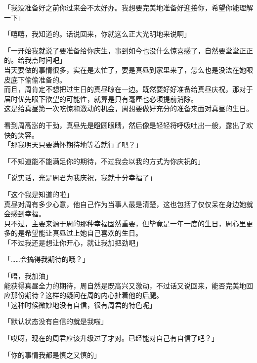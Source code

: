 「我没准备好之前你过来会不太好办。我想要完美地准备好迎接你，希望你能理解一下」

「嘻嘻，我知道的。话说回来，你就这么正大光明地来说啊」

「一开始我就说了要准备给你庆生，事到如今也没什么惊喜感了，自然要堂堂正正的。给我点时间吧」\\

当天要做的事情很多，实在是太忙了，要是真昼到家里来了，怎么也是没法在她眼皮底下偷偷准备的。\\

而且，周肯定不想把过生日的真昼晾在一边。既然要好好准备给真昼庆祝，那对于届时优先眼下欲望的可能性，就算是只有毫厘也必须提前消除。\\

这是给真昼第一次吃惊和激动的机会，周想要做好充分的准备来面对真昼的生日。

看到周高涨的干劲，真昼先是瞪圆眼睛，然后像是轻轻将呼吸吐出一般，露出了欢快的笑容。\\

「那我明天只要满怀期待地等着就行了吧？」

「不知道能不能满足你的期待，不过我会以我的方式为你庆祝的」

「说实话，光是周君为我庆祝，我就十分幸福了」

「这个我是知道的啦」\\

真昼对周有多少心意，他自己作为当事人最是清楚，这也包括了仅仅呆在身边她就会感到幸福。\\

只不过，主要来源于周的那种幸福固然重要，但毕竟是一年一度的生日，周心里更多的是希望能让真昼过上她自己喜欢的生日。\\

「不过我还是想让你开心，就让我加把劲吧」

「……会搞得我期待的哦？」

「唔，我加油」\\

能获得真昼全力的期待，周自然是既高兴又激动，不过话又说回来，能否完美地回应那份期待？这样的疑问在周的内心扯着他的后腿。\\

「这种时候微妙地没有自信，很有周君的特色呢」

「默认状态没有自信的就是我啦」

「哎呀，现在的周君应该升级过了才对。已经能对自己有自信了吧？」

「你的事情我都是慎之又慎的」\\

